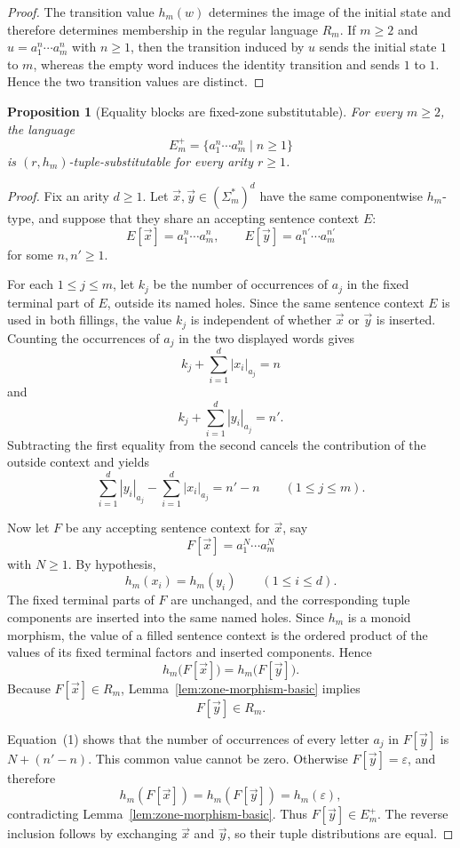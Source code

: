 \documentclass[11pt,a4paper]{article}
\newtheorem{proposition}[theorem]{Proposition}
\theoremstyle{remark}
\newcommand{\tuple}[1]{\vec{#1}}
\newcommand{\eps}{\varepsilon}
\begin{document}
\begin{proof}
The transition value \(h_m(w)\) determines the image of the initial state and
therefore determines membership in the regular language \(R_m\).  If \(m\ge2\) and
\(u=a_1^n\cdots a_m^n\) with \(n\ge1\), then the transition induced by \(u\)
sends the initial state \(1\) to \(m\), whereas the empty word induces the
identity transition and sends \(1\) to \(1\).  Hence the two transition values
are distinct.
\end{proof}

\begin{proposition}[Equality blocks are fixed-zone substitutable]
\label{prop:equality-block-substitutable}
For every \(m\ge2\), the language
\[
  E_m^+=\{a_1^n\cdots a_m^n\mid n\ge1\}
\]
is \((r,h_m)\)-tuple-substitutable for every arity \(r\ge1\).
\end{proposition}

\begin{proof}
Fix an arity \(d\ge1\).  Let
\(\tuple x,\tuple y\in(\Sigma_m^*)^d\) have the same componentwise
\(h_m\)-type, and suppose that they share an accepting sentence context \(E\):
\[
  E[\tuple x]=a_1^n\cdots a_m^n,
  \qquad
  E[\tuple y]=a_1^{n'}\cdots a_m^{n'}
\]
for some \(n,n'\ge1\).

For each \(1\le j\le m\), let \(k_j\) be the number of occurrences of \(a_j\)
in the fixed terminal part of \(E\), outside its named holes.  Since the same
sentence context \(E\) is used in both fillings, the value \(k_j\) is
independent of whether \(\tuple x\) or \(\tuple y\) is inserted.  Counting the
occurrences of \(a_j\) in the two displayed words gives
\[
  k_j+\sum_{i=1}^{d}|x_i|_{a_j}=n
\]
and
\[
  k_j+\sum_{i=1}^{d}|y_i|_{a_j}=n'.
\]
Subtracting the first equality from the second cancels the contribution of the
outside context and yields
\[
  \sum_{i=1}^{d}|y_i|_{a_j}
  -
  \sum_{i=1}^{d}|x_i|_{a_j}
  =n'-n
  \qquad (1\le j\le m).
  \tag{1}
\]

Now let \(F\) be any accepting sentence context for \(\tuple x\), say
\[
  F[\tuple x]=a_1^N\cdots a_m^N
\]
with \(N\ge1\).  By hypothesis,
\[
  h_m(x_i)=h_m(y_i)
  \qquad (1\le i\le d).
\]
The fixed terminal parts of \(F\) are unchanged, and the corresponding tuple
components are inserted into the same named holes.  Since \(h_m\) is a monoid
morphism, the value of a filled sentence context is the ordered product of the
values of its fixed terminal factors and inserted components.  Hence
\[
  h_m\bigl(F[\tuple x]\bigr)
  =
  h_m\bigl(F[\tuple y]\bigr).
\]
Because \(F[\tuple x]\in R_m\), Lemma~\ref{lem:zone-morphism-basic} implies
\[
  F[\tuple y]\in R_m.
\]

Equation~(1) shows that the number of occurrences of every letter \(a_j\) in
\(F[\tuple y]\) is \(N+(n'-n)\).  This common value cannot be zero.  Otherwise
\(F[\tuple y]=\eps\), and therefore
\[
  h_m(F[\tuple x])=h_m(F[\tuple y])=h_m(\eps),
\]
contradicting Lemma~\ref{lem:zone-morphism-basic}.  Thus
\(F[\tuple y]\in E_m^+\).  The reverse inclusion follows by exchanging
\(\tuple x\) and \(\tuple y\), so their tuple distributions are equal.
\end{proof}
\end{document}
